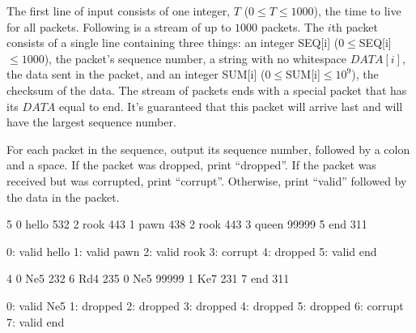 \begin{formalin}
The first line of input consists of one integer, $T$ ($0 \leq T \leq 1000$), the time to live for all packets. Following is a stream of up to $1000$ packets. The $i$th packet consists of a single line containing three things: an integer SEQ[i] ($0 \leq $SEQ[i]$ \leq 1000$), the packet's sequence number, a string with no whitespace $DATA[i]$, the data sent in the packet, and an integer SUM[i] ($0 \leq $SUM[i]$ \leq 10^{9}$), the checksum of the data. The stream of packets ends with a special packet that has its $DATA$ equal to end. It's guaranteed that this packet will arrive last and will have the largest sequence number.

\end{formalin}

\begin{formalout}
For each packet in the sequence, output its sequence number, followed by a colon and a space. If the packet was dropped, print ``dropped''. If the packet was received but was corrupted, print ``corrupt''. Otherwise, print ``valid'' followed by the data in the packet. 
\end{formalout}


\begin{datain}
5
0 hello 532
2 rook 443
1 pawn 438
2 rook 443
3 queen 99999
5 end 311
\end{datain}
\begin{dataout}
0: valid hello
1: valid pawn
2: valid rook
3: corrupt
4: dropped
5: valid end
\end{dataout}

\begin{datain}
4
0 Ne5 232
6 Rd4 235
0 Ne5 99999
1 Ke7 231
7 end 311
\end{datain}
\begin{dataout}
0: valid Ne5
1: dropped
2: dropped
3: dropped
4: dropped
5: dropped
6: corrupt
7: valid end
\end{dataout}


